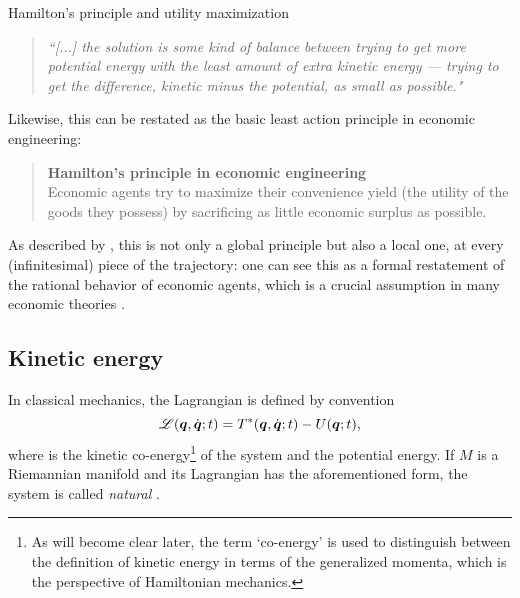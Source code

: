 \begin{econ}{Hamilton's principle and utility maximization}
    \begin{quote}
        \emph{``[...] the solution is some kind of balance between trying to get more potential energy with the least amount of extra kinetic energy — trying to get the difference, kinetic minus the potential, as small as possible."}
    \end{quote}
    Likewise, this can be restated as the basic least action principle in economic engineering:
    \begin{quote}
        \textbf{Hamilton's principle in economic engineering}\\ Economic agents try  to maximize their convenience yield (the utility of the goods they possess) by sacrificing as little  economic surplus as possible.
    \end{quote}
    As described by \citet{Feynman2010}, this is not only a global principle but also a local one, at every (infinitesimal) piece of the trajectory: one can see this as a formal restatement of the rational behavior of economic agents, which is a crucial assumption in many economic theories \cite{Mankiw2017}.
\end{econ}

\subsection{Kinetic energy}
In classical mechanics, the Lagrangian is defined by convention
\[\mathscr{L}(\vb*{q},\dot{\vb*{q}}; t) = T^*(\vb*{q},\dot{\vb*{q}}; t) - U(\vb*{q}; t),\] 
where  is the kinetic co-energy\footnote{As will become clear later, the term `co-energy' is used to distinguish between the definition of kinetic energy in terms of the generalized momenta, which is the perspective of Hamiltonian mechanics.} of the system and  the potential energy. If \(M\) is a Riemannian manifold and its Lagrangian has the aforementioned form, the system is called \emph{natural} \cite{Arnold1989}.

